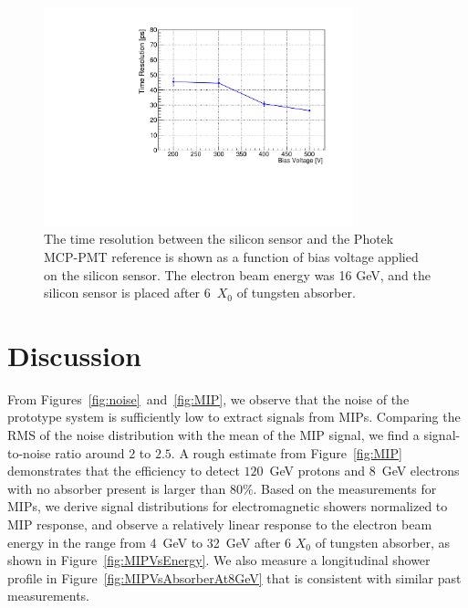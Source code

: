 \begin{figure}[htbp] 
\centering
\includegraphics[width=0.8\textwidth]{plots/SigmaT_vs_DV_lin30Stamp.pdf} 
\caption{The time resolution between the silicon sensor and the Photek MCP-PMT 
reference is shown as a function of bias voltage applied on the silicon sensor. The electron beam
energy was 16 GeV, and the silicon sensor is placed
after 6~$X_0$ of tungsten absorber.} 
\label{fig:SigmaT_vs_DV_lin30Stamp} 
\end{figure} 

\section{Discussion} 
\label{sec:discussion} 

From Figures~\ref{fig:noise}~and~\ref{fig:MIP}, we observe that the noise of the
prototype system is sufficiently low to extract signals from MIPs. Comparing the
RMS of the noise distribution with the mean of the MIP signal, we find a
signal-to-noise ratio around $2$ to $2.5$. A rough estimate from
Figure~\ref{fig:MIP} demonstrates that the efficiency to detect $120$~GeV
protons and $8$~GeV electrons with no absorber present is larger than $80\%$.
Based on the measurements for MIPs, we derive signal distributions for
electromagnetic showers normalized to MIP response, and observe a relatively
linear response to the electron beam energy in the range from 4~GeV to 32~GeV
after 6 $X_0$ of tungsten absorber, as shown in Figure~\ref{fig:MIPVsEnergy}. We also
measure a longitudinal shower profile in Figure~\ref{fig:MIPVsAbsorberAt8GeV}
that is consistent with similar past measurements.

